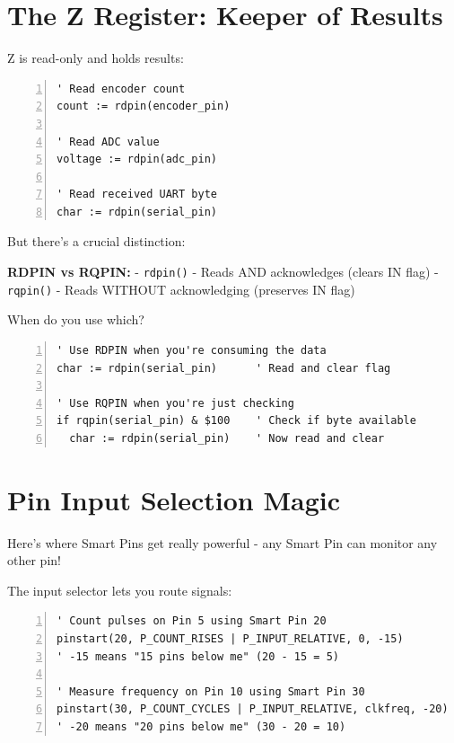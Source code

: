 \documentclass[11pt,a4paper,oneside,english]{book}
\begin{document}
\hypertarget{the-z-register-keeper-of-results}{%
\section{The Z Register: Keeper of
Results}\label{the-z-register-keeper-of-results}}

Z is read-only and holds results:

\begin{Spin2Block}
\begin{Verbatim}[numbers=left,numbersep=5pt,xleftmargin=15pt]
' Read encoder count
count := rdpin(encoder_pin)

' Read ADC value
voltage := rdpin(adc_pin)

' Read received UART byte
char := rdpin(serial_pin)
\end{Verbatim}
\end{Spin2Block}

But there's a crucial distinction:

\textbf{RDPIN vs RQPIN:} - \passthrough{\lstinline!rdpin()!} - Reads AND
acknowledges (clears IN flag) - \passthrough{\lstinline!rqpin()!} -
Reads WITHOUT acknowledging (preserves IN flag)

When do you use which?

\begin{Spin2Block}
\begin{Verbatim}[numbers=left,numbersep=5pt,xleftmargin=15pt]
' Use RDPIN when you're consuming the data
char := rdpin(serial_pin)      ' Read and clear flag

' Use RQPIN when you're just checking
if rqpin(serial_pin) & $100    ' Check if byte available
  char := rdpin(serial_pin)    ' Now read and clear
\end{Verbatim}
\end{Spin2Block}

\hypertarget{pin-input-selection-magic}{%
\section{Pin Input Selection Magic}\label{pin-input-selection-magic}}

Here's where Smart Pins get really powerful - any Smart Pin can monitor
any other pin!

The input selector lets you route signals:

\begin{Spin2Block}
\begin{Verbatim}[numbers=left,numbersep=5pt,xleftmargin=15pt]
' Count pulses on Pin 5 using Smart Pin 20
pinstart(20, P_COUNT_RISES | P_INPUT_RELATIVE, 0, -15)
' -15 means "15 pins below me" (20 - 15 = 5)

' Measure frequency on Pin 10 using Smart Pin 30
pinstart(30, P_COUNT_CYCLES | P_INPUT_RELATIVE, clkfreq, -20)  
' -20 means "20 pins below me" (30 - 20 = 10)
\end{Verbatim}
\end{Spin2Block}
\end{document}
